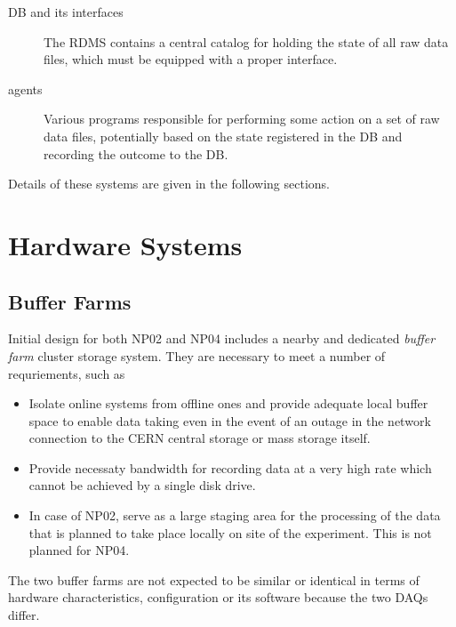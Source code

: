 \documentclass[pdftex,12pt,letter]{article}
\newcommand{\fixme}[1]{\textbf{FIXME: #1}}
\begin{document}
\begin{description}
\item[DB and its interfaces] The RDMS contains a central catalog for holding the state of all raw data files, which
must be equipped with a proper interface.

\item[agents] Various programs responsible for performing some action on a set of raw data files, potentially based on the state 
registered in the DB and recording the outcome to the DB.
\end{description}

\noindent Details of these systems are given in the following sections.

\section{Hardware Systems}

\subsection{Buffer Farms}

Initial design for both NP02 and NP04 includes a nearby and dedicated \textit{buffer farm} cluster storage system. 
They are necessary to meet a number of requriements, such as
\begin{itemize}
\item Isolate online systems from offline ones and provide adequate local buffer space to enable data taking
even in the event of an outage in the network connection to the CERN central storage or mass storage
itself.

\item Provide necessaty bandwidth for recording data at a very high rate which cannot be achieved
by a single disk drive.

\item In case of NP02, serve as a large staging area for the processing of the data that is planned to take place
locally on site of the experiment. This is not planned for NP04.

\end{itemize}

\noindent  The two buffer farms are not expected to be similar or identical  in terms of hardware characteristics, configuration or its software
because the two DAQs differ.


\end{document}
